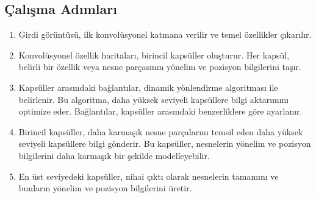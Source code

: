 \subsection{Çalışma Adımları}
\begin{enumerate}
	\item Girdi görüntüsü, ilk konvolüsyonel katmana verilir ve temel özellikler çıkarılır.
	\item Konvolüsyonel özellik haritaları, birincil kapsüller oluşturur. Her kapsül, belirli bir özellik veya nesne parçasının yönelim ve pozisyon bilgilerini taşır.
	\item Kapsüller arasındaki bağlantılar, dinamik yönlendirme algoritması ile belirlenir. Bu algoritma, daha yüksek seviyeli kapsüllere bilgi aktarımını optimize eder. Bağlantılar, kapsüller arasındaki benzerliklere göre ayarlanır.
	\item Birincil kapsüller, daha karmaşık nesne parçalarını temsil eden daha yüksek seviyeli kapsüllere bilgi gönderir. Bu kapsüller, nesnelerin yönelim ve pozisyon bilgilerini daha karmaşık bir şekilde modelleyebilir.
	\item En üst seviyedeki kapsüller, nihai çıktı olarak nesnelerin tamamını ve bunların yönelim ve pozisyon bilgilerini üretir.
\end{enumerate}

\newpage